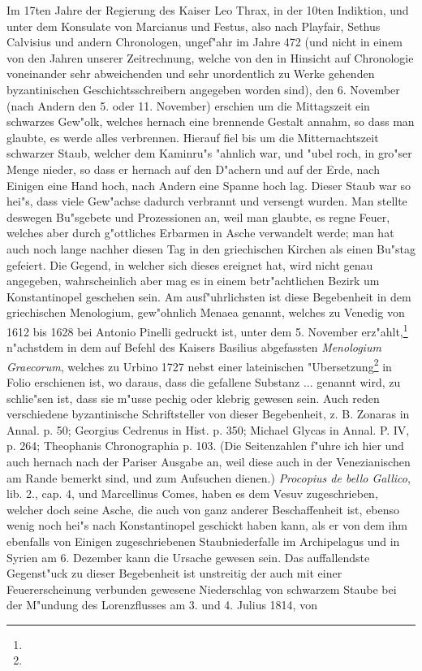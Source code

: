 \documentclass[a4paper, 11pt, oneside, polutonikogreek, german]{article}
\begin{document}
Im 17ten Jahre der Regierung des Kaiser Leo Thrax, in der 10ten Indiktion, und unter dem Konsulate von Marcianus und Festus, also nach Playfair, Sethus Calvisius und andern Chronologen, ungef"ahr im Jahre 472 (und nicht in einem von den Jahren unserer Zeitrechnung, welche von den in Hinsicht auf Chronologie voneinander sehr abweichenden und sehr unordentlich zu Werke gehenden byzantinischen Geschichtsschreibern angegeben worden sind), den 6. November (nach Andern den 5. oder 11. November) erschien um die Mittagszeit ein schwarzes Gew"olk, welches hernach eine brennende Gestalt annahm, so dass man glaubte, es werde alles verbrennen. Hierauf fiel bis um die Mitternachtszeit schwarzer Staub, welcher dem Kaminru"s "ahnlich war, und "ubel roch, in gro"ser Menge nieder, so dass er hernach auf den D"achern und auf der Erde, nach Einigen eine Hand hoch, nach Andern eine Spanne hoch lag. Dieser Staub war so hei"s, dass viele Gew"achse dadurch verbrannt und versengt wurden. Man stellte deswegen Bu"sgebete und Prozessionen an, weil man glaubte, es regne Feuer, welches aber durch g"ottliches Erbarmen in Asche verwandelt werde; man hat auch noch lange nachher diesen Tag in den griechischen Kirchen als einen Bu"stag gefeiert. Die Gegend, in welcher sich dieses ereignet hat, wird nicht genau angegeben, wahrscheinlich aber mag es in einem betr"achtlichen Bezirk um Konstantinopel geschehen sein. Am ausf"uhrlichsten ist diese Begebenheit in dem griechischen Menologium, gew"ohnlich Menaea genannt, welches zu Venedig von 1612 bis 1628 bei Antonio Pinelli gedruckt ist, unter dem 5. November erz"ahlt,\footnote{} n"achstdem in dem auf Befehl des Kaisers Basilius abgefassten \emph{Menologium Graecorum}, welches zu Urbino 1727 nebst einer lateinischen "Ubersetzung\footnote{} in Folio erschienen ist, wo daraus, dass die gefallene Substanz ... genannt wird, zu schlie"sen ist, dass sie m"usse pechig oder klebrig gewesen sein. Auch reden verschiedene byzantinische Schriftsteller von dieser Begebenheit, z. B. Zonaras in Annal. p. 50; Georgius Cedrenus in Hist. p. 350; Michael Glycas in Annal. P. IV, p. 264; Theophanis Chronographia p. 103. (Die Seitenzahlen f"uhre ich hier und auch hernach nach der Pariser Ausgabe an, weil diese auch in der Venezianischen am Rande bemerkt sind, und zum Aufsuchen dienen.) \emph{Procopius de bello Gallico}, lib. 2., cap. 4, und Marcellinus Comes, haben es dem Vesuv zugeschrieben, welcher doch seine Asche, die auch von ganz anderer Beschaffenheit ist, ebenso wenig noch hei"s nach Konstantinopel geschickt haben kann, als er von dem ihm ebenfalls von Einigen zugeschriebenen Staubniederfalle im Archipelagus und in Syrien am 6. Dezember kann die Ursache gewesen sein. Das auffallendste Gegenst"uck zu dieser Begebenheit ist unstreitig der auch mit einer Feuererscheinung verbunden gewesene Niederschlag von schwarzem Staube bei der M"undung des Lorenzflusses am 3. und 4. Julius 1814, von 
\end{document}
